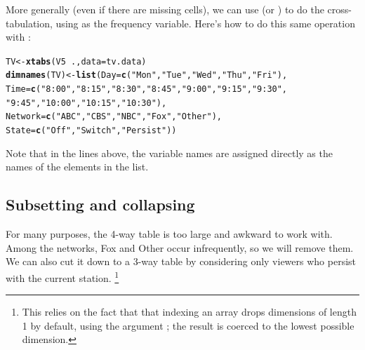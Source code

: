 \documentclass[11pt]{book}\usepackage[]{graphicx}\usepackage[]{color}
\makeatletter
\newcommand{\hlstr}[1]{\textcolor[rgb]{0.192,0.494,0.8}{#1}}%
\newcommand{\hlopt}[1]{\textcolor[rgb]{0,0,0}{#1}}%
\newcommand{\hlstd}[1]{\textcolor[rgb]{0.345,0.345,0.345}{#1}}%
\newcommand{\hlkwb}[1]{\textcolor[rgb]{0.69,0.353,0.396}{#1}}%
\newcommand{\hlkwc}[1]{\textcolor[rgb]{0.333,0.667,0.333}{#1}}%
\newcommand{\hlkwd}[1]{\textcolor[rgb]{0.737,0.353,0.396}{\textbf{#1}}}%
\newenvironment{kframe}{%
 \def\at@end@of@kframe{}%
 \ifinner\ifhmode%
  \def\at@end@of@kframe{\end{minipage}}%
  \begin{minipage}{\columnwidth}%
 \fi\fi%
 \def\FrameCommand##1{\hskip\@totalleftmargin \hskip-\fboxsep
 \colorbox{shadecolor}{##1}\hskip-\fboxsep
     \hskip-\linewidth \hskip-\@totalleftmargin \hskip\columnwidth}%
 \MakeFramed {\advance\hsize-\width
   \@totalleftmargin\z@ \linewidth\hsize
   \@setminipage}}%
 {\par\unskip\endMakeFramed%
 \at@end@of@kframe}
\newenvironment{knitrout}{}{} %
\renewenvironment{knitrout}{\small\renewcommand{\baselinestretch}{.85}}{} %
\makeatother
\begin{document}
More generally (even if there are missing cells), we can 
use  (or )
to do the cross-tabulation, using  as the
frequency variable.  Here's how to do this same operation with :
\begin{knitrout}
\color{fgcolor}\begin{kframe}
\begin{alltt}
\hlstd{TV} \hlkwb{<-} \hlkwd{xtabs}\hlstd{(V5} \hlopt{~} \hlstd{.,} \hlkwc{data}\hlstd{=tv.data)}
\hlkwd{dimnames}\hlstd{(TV)} \hlkwb{<-} \hlkwd{list}\hlstd{(}\hlkwc{Day}\hlstd{=}\hlkwd{c}\hlstd{(}\hlstr{"Mon"}\hlstd{,}\hlstr{"Tue"}\hlstd{,}\hlstr{"Wed"}\hlstd{,}\hlstr{"Thu"}\hlstd{,}\hlstr{"Fri"}\hlstd{),}
                \hlkwc{Time}\hlstd{=}\hlkwd{c}\hlstd{(}\hlstr{"8:00"}\hlstd{,}\hlstr{"8:15"}\hlstd{,}\hlstr{"8:30"}\hlstd{,}\hlstr{"8:45"}\hlstd{,}\hlstr{"9:00"}\hlstd{,}\hlstr{"9:15"}\hlstd{,}\hlstr{"9:30"}\hlstd{,}
                       \hlstr{"9:45"}\hlstd{,}\hlstr{"10:00"}\hlstd{,}\hlstr{"10:15"}\hlstd{,}\hlstr{"10:30"}\hlstd{),}
                \hlkwc{Network}\hlstd{=}\hlkwd{c}\hlstd{(}\hlstr{"ABC"}\hlstd{,}\hlstr{"CBS"}\hlstd{,}\hlstr{"NBC"}\hlstd{,}\hlstr{"Fox"}\hlstd{,}\hlstr{"Other"}\hlstd{),}
                \hlkwc{State}\hlstd{=}\hlkwd{c}\hlstd{(}\hlstr{"Off"}\hlstd{,}\hlstr{"Switch"}\hlstd{,}\hlstr{"Persist"}\hlstd{))}
\end{alltt}
\end{kframe}
\end{knitrout}

\noindent Note that in the lines above, the variable names are assigned directly
as the names of the elements in the  list.

\subsection{Subsetting and collapsing}
For many purposes, 
the 4-way table 
is too large and awkward to work with. Among the networks,
Fox and Other occur infrequently, so we will remove them.
We can also cut it down to a 3-way table by considering only viewers who persist
with the current station.%
\footnote{This relies on the fact that that indexing
an array drops dimensions of length 1 by default,
using the argument ;
the result is coerced to the lowest possible dimension.
}
\end{document}
